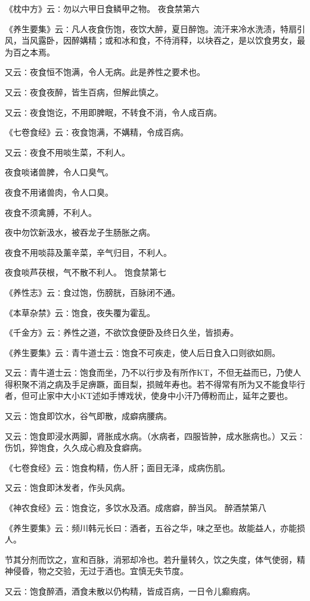 \documentclass[a4paper,12pt,UTF8,twoside]{ctexbook}
\begin{document}
《枕中方》云∶勿以六甲日食鳞甲之物。
夜食禁第六

《养生要集》云∶凡人夜食伤饱，夜饮大醉，夏日醉饱。流汗来冷水洗渍，特扇引风，当风露卧，因醉媾精；或和冰和食，不待消释，以块吞之，是以饮食男女，最为百之本焉。

又云∶夜食恒不饱满，令人无病。此是养性之要术也。

又云∶夜食夜醉，皆生百病，但解此慎之。

又云∶夜食饱讫，不用即脾眠，不转食不消，令人成百病。

《七卷食经》云∶夜食饱满，不媾精，令成百病。

又云∶夜食不用啖生菜，不利人。

夜食啖诸兽脾，令人口臭气。

夜食不用诸兽肉，令人口臭。

夜食不须禽膊，不利人。

夜中勿饮新汲水，被吞龙子生肠胀之病。

夜食不用啖蒜及薰辛菜，辛气归目，不利人。

夜食啖芦茯根，气不散不利人。
饱食禁第七

《养性志》云∶食过饱，伤膀胱，百脉闭不通。

《本草杂禁》云∶饱食，夜失覆为霍乱。

《千金方》云∶养性之道，不欲饮食便卧及终日久坐，皆损寿。

《养生要集》云∶青牛道士云∶饱食不可疾走，使人后日食入口则欲如厕。

又云∶青牛道士云∶饱食而坐，乃不以行步及有所作KT，不但无益而已，乃使人得积聚不消之病及手足痹蹶，面目梨，损贼年寿也。若不得常有所为又不能食毕行者，但可止家中大小KT述如手博戏状，使身中小汗乃傅粉而止，延年之要也。

又云∶饱食即饮水，谷气即散，成癖病腰病。

又云∶饱食即浸水两脚，肾胀成水病。（水病者，四服皆肿，成水胀病也。）又云∶伤饥，猝饱食，久久成心瘕及食癖病。

《七卷食经》云∶饱食构精，伤人肝；面目无泽，成病伤肌。

又云∶饱食即沐发者，作头风病。

《神农食经》云∶饱食讫，多饮水及酒。成痞癖，醉当风。
醉酒禁第八

《养生要集》云∶频川韩元长曰∶酒者，五谷之华，味之至也。故能益人，亦能损人。

节其分剂而饮之，宣和百脉，消邪却冷也。若升量转久，饮之失度，体气使弱，精神侵昏，物之交验，无过于酒也。宜慎无失节度。

又云∶饱食醉酒，酒食未散以仍构精，皆成百病，一日令儿癫瘕病。
\end{document}
